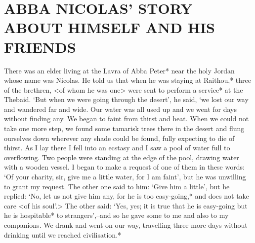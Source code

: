\chapter{ABBA NICOLAS' STORY ABOUT HIMSELF AND HIS FRIENDS}

There was an elder living at the Lavra of Abba Peter* near the holy Jordan whose name was Nicolas.
He told us that when he was staying at Raithou,* three of the brethren, <of whom he was one> were sent to perform a service* at the Thebaid.
`But when we were going through the desert', he said, `we lost our way and wandered far and wide.
Our water was all used up and we went for days without finding any.
We began to faint from thirst and heat.
When we could not take one more step, we found some tamarisk trees there in the desert and flung ourselves down wherever any shade could be found, fully expecting to die of thirst.
As I lay there I fell into an ecstasy and I saw a pool of water full to overflowing.
Two people were standing at the edge of the pool, drawing water with a wooden vessel.
I began to make a request of one of them in these words: `Of your charity, sir, give me a little water, for I am faint', but he was unwilling to grant my request.
The other one said to him: `Give him a little', but he replied: `No, let us not give him any, for he is too easy-going,* and does not take care <of his soul'.>
The other said: `Yes, yes; it is true that he is easy-going but he is hospitable* to strangers',--and so he gave some to me and also to my companions.
We drank and went on our way, travelling three more days without drinking until we reached civilisation.*

